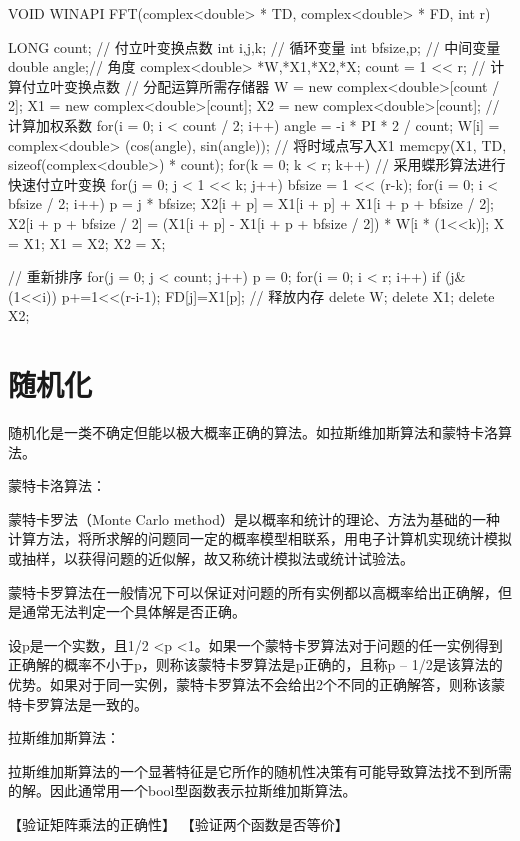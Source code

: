 \begin{Code}
	VOID WINAPI FFT(complex<double> * TD, complex<double> * FD, int r)  {  
		LONG count;  // 付立叶变换点数
		int i,j,k;  // 循环变量
		int bfsize,p;  // 中间变量  
		double angle;// 角度  
		complex<double> *W,*X1,*X2,*X;  
		count = 1 << r;  // 计算付立叶变换点数
		// 分配运算所需存储器  
		W = new complex<double>[count / 2];  
		X1 = new complex<double>[count];  
		X2 = new complex<double>[count];  
		// 计算加权系数  
		for(i = 0; i < count / 2; i++)  {  
			angle = -i * PI * 2 / count;  
			W[i] = complex<double> (cos(angle), sin(angle));  
		}  
		// 将时域点写入X1  
		memcpy(X1, TD, sizeof(complex<double>) * count);  
		for(k = 0; k < r; k++) {  // 采用蝶形算法进行快速付立叶变换 
			for(j = 0; j < 1 << k; j++)  {  
				bfsize = 1 << (r-k);  
				for(i = 0; i < bfsize / 2; i++)  {  
					p = j * bfsize;  
					X2[i + p] = X1[i + p] + X1[i + p + bfsize / 2];  
					X2[i + p + bfsize / 2] = (X1[i + p] - X1[i + p + bfsize / 2]) * W[i * (1<<k)];  
				}  
			}  
			X = X1;  
			X1 = X2;  
			X2 = X;  
		}  
		
		// 重新排序  
		for(j = 0; j < count; j++)  {  
			p = 0;  
			for(i = 0; i < r; i++)  {  
				if (j&(1<<i))  
					p+=1<<(r-i-1);  
			}  
			FD[j]=X1[p];  
		}  	
		// 释放内存  
		delete W;  
		delete X1;  
		delete X2;  
	}  
\end{Code}

\section{随机化}
随机化是一类不确定但能以极大概率正确的算法。如拉斯维加斯算法和蒙特卡洛算法。

蒙特卡洛算法：

蒙特卡罗法（Monte Carlo method）是以概率和统计的理论、方法为基础的一种计算方法，将所求解的问题同一定的概率模型相联系，用电子计算机实现统计模拟或抽样，以获得问题的近似解，故又称统计模拟法或统计试验法。

蒙特卡罗算法在一般情况下可以保证对问题的所有实例都以高概率给出正确解，但是通常无法判定一个具体解是否正确。

设p是一个实数，且1/2 <p <1。如果一个蒙特卡罗算法对于问题的任一实例得到正确解的概率不小于p，则称该蒙特卡罗算法是p正确的，且称p – 
1/2是该算法的优势。如果对于同一实例，蒙特卡罗算法不会给出2个不同的正确解答，则称该蒙特卡罗算法是一致的。

拉斯维加斯算法：

拉斯维加斯算法的一个显著特征是它所作的随机性决策有可能导致算法找不到所需的解。因此通常用一个bool型函数表示拉斯维加斯算法。

【验证矩阵乘法的正确性】
【验证两个函数是否等价】